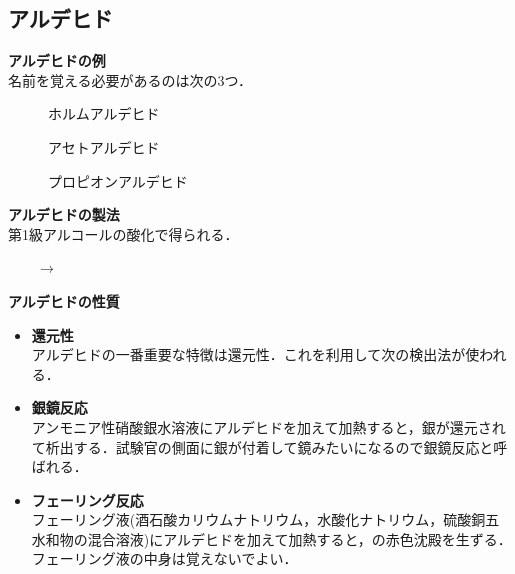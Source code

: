 \documentclass[a4paper,12pt]{ltjsreport}
\begin{document}
\subsection{アルデヒド}
\noindent \textbf{アルデヒドの例}\\
名前を覚える必要があるのは次の3つ．\\
\begin{minipage}{0.33\linewidth}
\begin{figure}[H]
    \centering
\caption{ホルムアルデヒド} 
\end{figure}
\end{minipage}
\begin{minipage}{0.33\linewidth}
\begin{figure}[H]
    \centering
\caption{アセトアルデヒド} 
\end{figure}
\end{minipage}
\begin{minipage}{0.33\linewidth}
\begin{figure}[H]
    \centering
\caption{プロピオンアルデヒド} 
\end{figure}
\end{minipage}
\noindent \textbf{アルデヒドの製法}\\
第1級アルコールの酸化で得られる．\\[4pt]
\centerline{~~~~$\longrightarrow$~~~~}
\noindent \textbf{アルデヒドの性質}
\begin{itemize}
    \item\textbf{還元性}\\
    アルデヒドの一番重要な特徴は還元性．これを利用して次の検出法が使われる．
    \item \textbf{銀鏡反応}\\
    アンモニア性硝酸銀水溶液にアルデヒドを加えて加熱すると，銀が還元されて析出する．試験官の側面に銀が付着して鏡みたいになるので銀鏡反応と呼ばれる．
    \item \textbf{フェーリング反応}\\
    フェーリング液(酒石酸カリウムナトリウム，水酸化ナトリウム，硫酸銅五水和物の混合溶液)にアルデヒドを加えて加熱すると，の赤色沈殿を生ずる．フェーリング液の中身は覚えないでよい．
\end{itemize}
\end{document}

